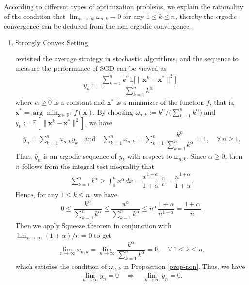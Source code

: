 \documentclass[twoside,11pt]{article}
\begin{document}
\begin{example}\label{e2}
According to different types of optimization problems, we explain the rationality of the condition that $\lim_{n\to\infty}\omega_{n,k}=0$ for any $1\leq k\leq n$, thereby the ergodic convergence can be deduced from the non-ergodic convergence.
\begin{enumerate}
\item[$(1)$]Strongly Convex Setting
\par \citet{guo2020revisiting} revisited the average strategy in stochastic algorithms, and the sequence to measure the performance of SGD can be viewed as
\begin{align*}
	\bar{y}_{n}
	:=
	\dfrac{\sum_{k=1}^{n}k^{\alpha}
	\mathbb{E}\big[
	\lVert\mathbf{x}^{k}-\mathbf{x}^{*}
	\rVert^{2}\big]}
	{\sum_{k=1}^{n}k^{\alpha}},
\end{align*}
where $\alpha\geq 0$ is a constant and $\mathbf{x}^{*}$ is a minimizer of the function $f$, that is, $\mathbf{x}^{*}=\arg\min_{\mathbf{x}\in\mathbb{R}^d}f(\mathbf{x})$. By choosing $\omega_{n,k}:=k^{\alpha}/\big(\sum_{k=1}^{n}k^{\alpha}\big)$ and $y_{k}:=\mathbb{E}[\lVert\mathbf{x}^{k}-\mathbf{x}^{*}\rVert^{2}]$, we have
\begin{align*}
	\bar{y}_{n}
	=\sum_{k=1}^{n}
	\omega_{n,k}y_{k}
	\quad 
	\text{and}\quad 
	\sum_{k=1}^{n}\omega_{n,k}
	=\sum_{k=1}^{n}
	\dfrac{k^{\alpha}}
	{\sum_{k=1}^{n}k^{\alpha}}=1,
	\quad \forall\,n\geq 1.
\end{align*}
Thus, $\bar{y}_{n}$ is an ergodic sequence of $y_{k}$ with respect to $\omega_{n,k}$. Since $\alpha\geq 0$, then it follows from the integral test inequality that 
\begin{align*}
	\sum_{k=1}^{n}k^{\alpha}
	\geq  \int_{0}^{n}x^{\alpha}\,dx
	=\dfrac{x^{1+\alpha}}{1+\alpha}
	\,\bigg\vert_{0}^{n}
	=\dfrac{n^{1+\alpha}}{1+\alpha}.
\end{align*}
Hence, for any $1\leq k\leq n$, we have
\begin{align*}
	0\leq 
	\dfrac{k^{\alpha}}
	{\sum_{k=1}^{n}k^{\alpha}}
	\leq 
	\dfrac{n^{\alpha}}
	{\sum_{k=1}^{n}k^{\alpha}}
	\leq n^{\alpha}\,\dfrac{1+\alpha}{n^{1+\alpha}}
	=\dfrac{1+\alpha}{n}.
\end{align*}
Then we apply Squeeze theorem in conjunction with $\lim_{n\to\infty}(1+\alpha)/n=0$ to get 
\begin{align*}
	\lim_{n\to\infty}\omega_{n,k}
	=\lim_{n\to\infty}
	\dfrac{k^{\alpha}}{\sum_{k=1}^{n}
		k^{\alpha}}
	=0,\quad
	\forall\,1\leq k\leq n,
\end{align*}
which satisfies the condition of $\omega_{n,k}$ in Proposition \ref{prop-non}. Thus, we have
\begin{align*}
	\lim_{n\to\infty}
	y_{n}=0
	\quad \Longrightarrow\quad 
	\lim_{n\to\infty}
	\bar{y}_{n}=0.
\end{align*}


\end{enumerate}
\end{example}
\end{document}
